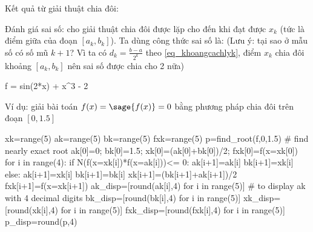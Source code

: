 \documentclass[12pt]{article}
\begin{document}
\newpage{}

Kết quả từ giải thuật chia đôi:

\newpage{}

Đánh giá sai số: cho giải thuật chia đôi được lặp cho đến khi đạt được $x_k$ (tức là điểm giữa của đoạn $[a_k,b_k]$). Ta dùng công thức sai số là:
(Lưu ý: tại sao ở mẫu số có số mũ $k+1$? Vì ta có $d_k= \frac{b-a}{2^{k}}$ theo \eqref{eq_khoangcachlyk}, điểm $x_k$ chia đôi khoảng $[a_k,b_k]$ nên sai số được chia cho 2 nữa)

\newpage{}

\begin{sagesilent}
f = sin(2*x) + x^3 - 2
\end{sagesilent}
Ví dụ: giải bài toán $f(x)=\sage{f(x)}=0$ bằng phương pháp chia đôi trên đoạn $[0,1.5]$

\begin{sagesilent}
 xk=range(5)
 ak=range(5)
 bk=range(5)
 fxk=range(5)
 p=find_root(f,0,1.5) # find nearly exact root
 ak[0]=0; bk[0]=1.5; xk[0]=(ak[0]+bk[0])/2; fxk[0]=f(x=xk[0])
 for i in range(4):
    if N(f(x=xk[i])*f(x=ak[i]))<= 0:
        ak[i+1]=ak[i]
        bk[i+1]=xk[i]
    else:    
        ak[i+1]=xk[i]
        bk[i+1]=bk[i]
    xk[i+1]=(bk[i+1]+ak[i+1])/2
    fxk[i+1]=f(x=xk[i+1])
 ak_disp=[round(ak[i],4) for i in range(5)] # to display ak with 4 decimal digits
 bk_disp=[round(bk[i],4) for i in range(5)]
 xk_disp=[round(xk[i],4) for i in range(5)]
 fxk_disp=[round(fxk[i],4) for i in range(5)]
 p_disp=round(p,4)
\end{sagesilent}
\end{document}
